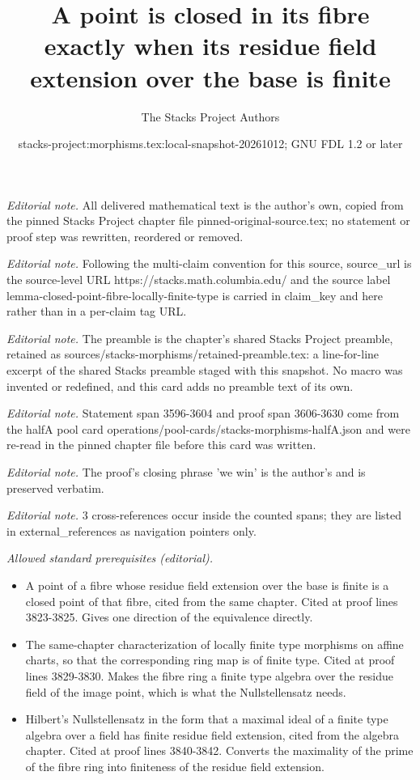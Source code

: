 \documentclass[10pt,a4paper]{amsart}
\title{A point is closed in its fibre exactly when its residue field extension over the base is finite}
\author{The Stacks Project Authors}
\date{stacks-project:morphisms.tex:local-snapshot-20261012; GNU FDL 1.2 or later}
\theoremstyle{plain}
\theoremstyle{definition}
\theoremstyle{remark}
\numberwithin{equation}{subsection}
\begin{document}
\maketitle
\noindent\textit{Editorial note.} All delivered mathematical text is the author's own, copied from the pinned Stacks Project chapter file pinned-original-source.tex; no statement or proof step was rewritten, reordered or removed.\par\medskip
\noindent\textit{Editorial note.} Following the multi-claim convention for this source, source\_url is the source-level URL https://stacks.math.columbia.edu/ and the source label lemma-closed-point-fibre-locally-finite-type is carried in claim\_key and here rather than in a per-claim tag URL.\par\medskip
\noindent\textit{Editorial note.} The preamble is the chapter's shared Stacks Project preamble, retained as sources/stacks-morphisms/retained-preamble.tex: a line-for-line excerpt of the shared Stacks preamble staged with this snapshot. No macro was invented or redefined, and this card adds no preamble text of its own.\par\medskip
\noindent\textit{Editorial note.} Statement span 3596-3604 and proof span 3606-3630 come from the halfA pool card operations/pool-cards/stacks-morphisms-halfA.json and were re-read in the pinned chapter file before this card was written.\par\medskip
\noindent\textit{Editorial note.} The proof's closing phrase 'we win' is the author's and is preserved verbatim.\par\medskip
\noindent\textit{Editorial note.} 3 cross-references occur inside the counted spans; they are listed in external\_references as navigation pointers only.\par\medskip
\noindent\textit{Allowed standard prerequisites (editorial).}\begin{itemize}
\item A point of a fibre whose residue field extension over the base is finite is a closed point of that fibre, cited from the same chapter. Cited at proof lines 3823-3825. Gives one direction of the equivalence directly.
\item The same-chapter characterization of locally finite type morphisms on affine charts, so that the corresponding ring map is of finite type. Cited at proof lines 3829-3830. Makes the fibre ring a finite type algebra over the residue field of the image point, which is what the Nullstellensatz needs.
\item Hilbert's Nullstellensatz in the form that a maximal ideal of a finite type algebra over a field has finite residue field extension, cited from the algebra chapter. Cited at proof lines 3840-3842. Converts the maximality of the prime of the fibre ring into finiteness of the residue field extension.
\end{itemize}\medskip
\end{document}
